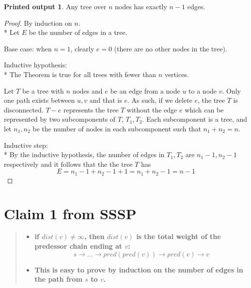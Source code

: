 \documentclass[titlepage]{article}
\theoremstyle{definition}
\newtheorem{name}{Printed output}
\begin{document}
\newtheorem{mydef}{Theorem}

\begin{name}
  Any tree over $n$ nodes has exactly $n-1$ edges.
\end{name}


\begin{proof}
By induction on $n$. \\*
Let $E$ be the number of edges in a tree.

Base case: when $n =1$, clearly $e = 0$ (there are no other nodes in the tree).

Inductive hypothesis: \\*
The Theorem is true for all trees with fewer than $ n$ vertices.

Let $T$ be a tree with $n$ nodes and $e$ be an edge from a node $u$ to a node
$v$. Only one path exists between $u,v$ and that is $e$. As such, if we delete $e$, the
tree $T$ is disconnected. $T - e$ represents the tree $T$ without the edge $e$
which can be represented by two subcomponents of $T$, $T_1, T_2$. Each
subcomponent is a tree, and let $n_1,n_2$ be the number of nodes in each
subcomponent such that $n_1 + n_2 = n$. 

Inductive step: \\*
By the inductive hypothesis, the number of edges in $T_1, T_2$ are $n_1-1,
n_2-1$
respectively and it follows that the the tree $T$ has 
\[ E = n_1 -1 + n_2 -1 +1 = n_1 + n_2-1 = n-1 \]
  \qedhere
\end{proof}


\section{Claim 1 from SSSP}
  \begin{quote}
  \begin{itemize}
    \item \textbf{if $dist(v) \neq \infty $, then $dist(v)$ is the total weight
    of the predessor chain ending at $v$:
    \[ s \rightarrow \dots \rightarrow pred(pred(v)) \rightarrow pred(v) \rightarrow v \] }
    \item \textbf{This is easy to prove by induction on the number of edges in
    the path from $s$ to $v$.}
  \end{itemize}
  \end{quote}
\end{document}
